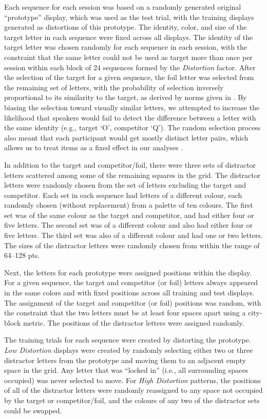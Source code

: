 \documentclass[natbib,man,a4paper]{apa6}
\begin{document}
Each sequence for each session was based on a randomly generated original ``prototype'' display, which was used as the test trial, with the training displays generated as distortions of this prototype.  The identity, color, and size of the target letter in each sequence were fixed across all displays. The identity of the target letter was chosen randomly for each sequence in each session, with the constraint that the same letter could not be used as target more than once per session within each block of 24 sequences formed by the \emph{Distortion} factor. After the selection of the target for a given sequence, the foil letter was selected from the remaining set of letters, with the probability of selection inversely proportional to its similarity to the target, as derived by norms given in \cite{simpson2013letter}.  By biasing the selection toward visually similar letters, we attempted to increase the likelihood that speakers would fail to detect the difference between a letter with the same identity (e.g., target `O', competitor `Q'). The random selection process also meant that each participant would get mostly distinct letter pairs, which allows us to treat items as a fixed effect in our analyses \citep{clark73}.

In addition to the target and competitor/foil, there were three sets of distractor letters scattered among some of the remaining squares in the grid. The distractor letters were randomly chosen from the set of letters excluding the target and competitor. Each set in each sequence had letters of a different colour, each randomly chosen (without replacement) from a palette of ten colours. The first set was of the same colour as the target and competitor, and had either four or five letters. The second set was of a different colour and also had either four or five letters. The third set was also of a different colour and had one or two letters. The sizes of the distractor letters were randomly chosen from within the range of 64--128 pts. 

Next, the letters for each prototype were assigned positions within the display. For a given sequence, the target and competitor (or foil) letters always appeared in the same colors and with fixed positions across all training and test displays. The assignment of the target and competitor (or foil) positions was random, with the constraint that the two letters must be at least four spaces apart using a city-block metric. The positions of the distractor letters were assigned randomly.

The training trials for each sequence were created by distorting the prototype. \emph{Low Distortion} displays were created by randomly selecting either two or three distractor letters from the prototype and moving them to an adjacent empty space in the grid. Any letter that was ``locked in'' (i.e., all surrounding spaces occupied) was never selected to move.  For \emph{High Distortion} patterns, the positions of all of the distractor letters were randomly reassigned to any space not occupied by the target or competitor/foil, and the colours of any two of the distractor sets could be swapped. 
\end{document}
